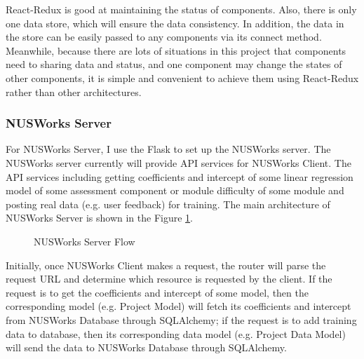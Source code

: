 \documentclass[fyp]{socreport}
\begin{document}
React-Redux is good at maintaining the status of components. Also, there is only one data store, which will ensure the data consistency. In addition, the data in the store can be easily passed to any components via its connect method. Meanwhile, because there are lots of situations in this project that components need to sharing data and status, and one component may change the states of other components, it is simple and convenient to achieve them using React-Redux rather than other architectures.

\subsubsection{NUSWorks Server}
For NUSWorks Server, I use the Flask to set up the NUSWorks server. The NUSWorks server currently will provide API services for NUSWorks Client. The API services including getting coefficients and intercept of some linear regression model of some assessment component or module difficulty of some module and posting real data (e.g. user feedback) for training. The main architecture of NUSWorks Server is shown in the Figure {\ref{nusworks-server}}.

\begin{figure}
\caption{NUSWorks Server Flow}
\label{nusworks-server}
\end{figure}

Initially, once NUSWorks Client makes a request, the router will parse the request URL and determine which resource is requested by the client. If the request is to get the coefficients and intercept of some model, then the corresponding model (e.g. Project Model) will fetch its coefficients and intercept from NUSWorks Database through SQLAlchemy; if the request is to add training data to database, then its corresponding data model (e.g. Project Data Model) will send the data to NUSWorks Database through SQLAlchemy.
\end{document}
